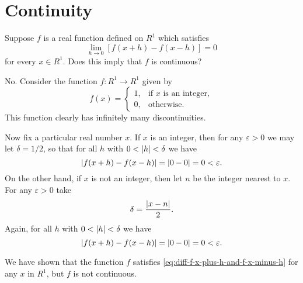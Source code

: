 \chapter{Continuity}

 Suppose $f$ is a real function defined on $R^1$ which
satisfies
\begin{equation}
  \label{eq:diff-f-x-plus-h-and-f-x-minus-h}
  \lim_{h\to0}[f(x+h)-f(x-h)]=0
\end{equation}
for every $x\in R^1$. Does this imply that $f$ is continuous?
\begin{solution}
  No. Consider the function $f\colon R^1\to R^1$ given by
  \begin{equation*}
    f(x) =
    \begin{cases}
      1, & \text{if $x$ is an integer}, \\
      0, & \text{otherwise}.
    \end{cases}
  \end{equation*}
  This function clearly has infinitely many discontinuities.

  Now fix a particular real number $x$. If $x$ is an integer, then for
  any $\varepsilon > 0$ we may let $\delta = 1/2$, so that for all $h$
  with $0<\lvert{h}\rvert<\delta$ we have
  \begin{equation*}
    \lvert{f(x + h) - f(x - h)}\rvert = \lvert{0 - 0}\rvert = 0 < \varepsilon.
  \end{equation*}
  On the other hand, if $x$ is not an integer, then let $n$ be the
  integer nearest to $x$. For any $\varepsilon > 0$ take
  \begin{equation*}
    \delta = \frac{\lvert{x - n}\rvert}2.
  \end{equation*}
  Again, for all $h$ with $0<\lvert{h}\rvert<\delta$ we have
  \begin{equation*}
    \lvert{f(x + h) - f(x - h)}\rvert = \lvert{0 - 0}\rvert = 0 < \varepsilon.
  \end{equation*}

  We have shown that the function $f$ satisfies
  \eqref{eq:diff-f-x-plus-h-and-f-x-minus-h} for any $x$ in $R^1$, but
  $f$ is not continuous.
\end{solution}


